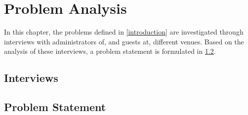 \chapter{Problem Analysis}
\label{cha:problem_analysis}

In this chapter, the problems defined in \cref{introduction} are
investigated through interviews with administrators of, and guests at,
different venues. Based on the analysis of these interviews, a problem statement
is formulated in \cref{ProblemStatement}.

\section{Interviews}




\section{Problem Statement}
\label{ProblemStatement}

